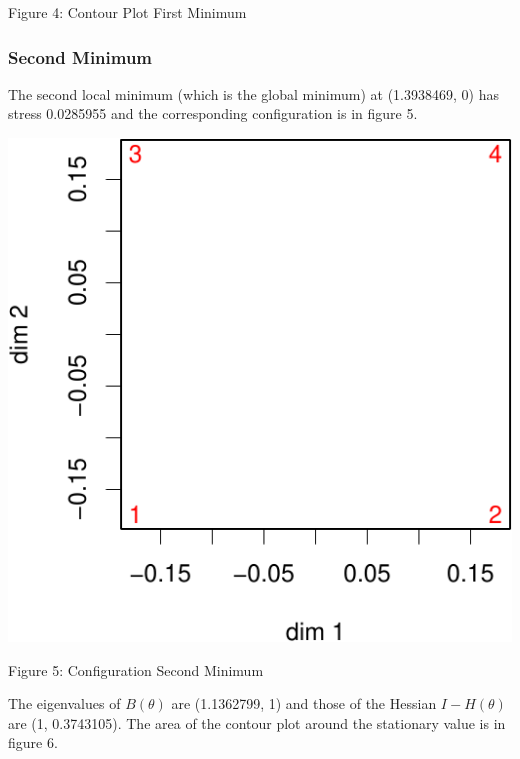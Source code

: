 \documentclass[
  12pt,
]{article}
\begin{document}
Figure 4: Contour Plot First Minimum

\subsubsection{Second Minimum}\label{second-minimum}

The second local minimum (which is the global minimum) at (1.3938469, 0) has stress 0.0285955 and the corresponding configuration is in figure 5.

\begin{center}\includegraphics{twoPoints_files/figure-latex/configuration_second_minimum-1} \end{center}

Figure 5: Configuration Second Minimum

The eigenvalues of \(B(\theta)\) are (1.1362799, 1) and those of the Hessian \(I-H(\theta)\) are
(1, 0.3743105). The area of the contour plot around the stationary value is in figure 6.
\end{document}
